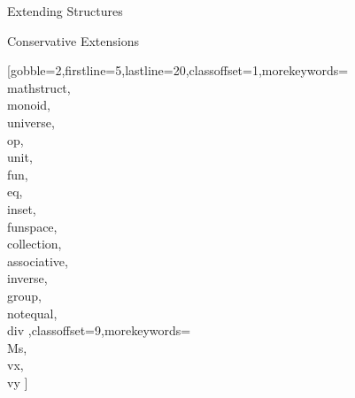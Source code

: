 \documentclass[lang={en,de}]{stex}
\begin{document}
\begin{sfragment}{Extending Structures}
    \begin{sfragment}{Conservative Extensions}

      [gobble=2,firstline=5,lastline=20,classoffset=1,morekeywords={
      \\mathstruct,\\monoid,\\universe,\\op,\\unit,\\fun,\\eq,\\inset,
      \\funspace,\\collection,\\associative,\\inverse,\\group,\\notequal,\\div
      },classoffset=9,morekeywords={
        \\Ms,\\vx,\\vy
      }]
    \end{sfragment}
    
  \end{sfragment}
\end{document}
